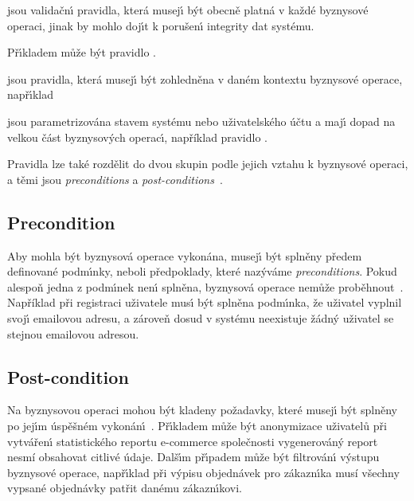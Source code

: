 \begin{description}
    \item [Bezkontextová pravidla] jsou validačn\'{\i} pravidla, která musej\'{\i} b\'yt obecně platná
    v každé byznysové operaci, jinak by mohlo doj\'{\i}t k porušen\'{\i} integrity dat systému.
    \item Př\'{\i}kladem může b\'yt pravidlo .
    \item [Kontextová pravidla] jsou pravidla, která musej\'{\i} b\'yt zohledněna v daném kontextu
    byznysové operace, např\'{\i}klad 
    \item [Průřezová pravidla] jsou parametrizována stavem systému nebo uživatelského účtu a maj\'{\i}
    dopad na velkou část byznysov\'ych operac\'{\i}, například pravidlo .
\end{description}

Pravidla lze také rozdělit do dvou skupin podle jejich vztahu k byznysové operaci, a těmi jsou
\textit{preconditions} a \textit{post-conditions}~\cite{cemus2015automated}.

\subsection{Precondition}

Aby mohla b\'yt byznysová operace vykonána, musej\'{\i}
b\'yt splněny předem definované podm\'{\i}nky, neboli předpoklady,
které naz\'yváme \textit{preconditions}. Pokud alespoň jedna z podm\'{\i}nek
nen\'{\i} splněna, byznysová operace nemůže proběhnout~\cite{larman2001patterns}.
Například při registraci uživatele mus\'{\i} b\'yt splněna podm\'{\i}nka,
že uživatel vyplnil svoj\'{\i} emailovou adresu, a zároveň
dosud v systému neexistuje žádn\'y uživatel se stejnou emailovou adresou.

\subsection{Post-condition}

Na byznysovou operaci mohou b\'yt kladeny požadavky, které
musej\'{\i} b\'yt splněny po jej\'{\i}m úspěšném vykonán\'{\i}~\cite{cemus2015automated}.
Př\'{\i}kladem může b\'yt anonymizace uživatelů při vytvářen\'{\i} statistického
reportu e-commerce společnosti \textendash\xspace vygenerováný report
nesmí obsahovat citlivé údaje. Dalš\'{\i}m př\'{\i}padem může b\'yt filtrován\'{\i}
v\'ystupu byznysové operace, např\'{\i}klad při v\'ypisu objednávek pro zákazn\'{\i}ka
musí všechny vypsané objednávky patřit danému zákazn\'{\i}kovi.

